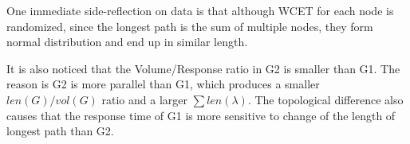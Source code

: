 \documentclass[./report.tex]{subfiles}
\begin{document}
One immediate side-reflection on data is that although WCET for each node is randomized, since the longest path is the sum of multiple nodes, they form normal distribution and end up in similar length.

It is also noticed that the Volume/Response ratio in G2 is smaller than G1. The reason is G2 is more parallel than G1, which produces a smaller $len(G)/vol(G)$ ratio and a larger $\sum len(\lambda)$. The topological difference also causes that the response time of G1 is more sensitive to change of the length of longest path than G2.
\end{document}
